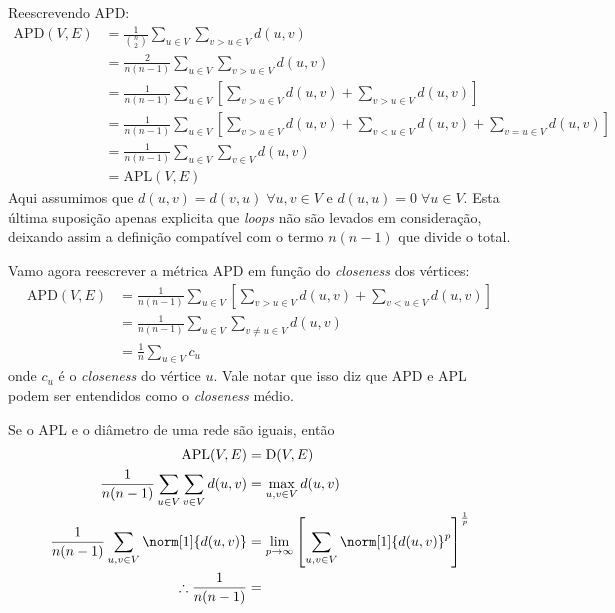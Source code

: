 \documentclass[l15, tikzdraw]{homework}
\begin{document}
	\subquest{}%
	Reescrevendo APD:
	\begin{align*}
		\text{APD}(V, E) %
		&= \frac{1}{\binom{n}{2}} \sum_{u \in V} \sum_{v > u \in V} d(u, v)\\[1ex]
		&= \frac{2}{n (n - 1)} \sum_{u \in V} \sum_{v > u \in V} d(u, v)\\[1ex]
		&= \frac{1}{n (n - 1)} \sum_{u \in V} \left[ \sum_{v > u \in V} d(u, v) + \sum_{v > u \in V} d(u, v) \right]\\
		&= \frac{1}{n (n - 1)} \sum_{u \in V} \left[ \sum_{v > u \in V} d(u, v) + \sum_{v < u \in V} d(u, v) + \sum_{v = u \in V} d(u, v)\right]\\
		&= \frac{1}{n (n - 1)} \sum_{u \in V} \sum_{v \in V} d(u, v)\\
		&= \text{APL}(V, E)
	\end{align*}
	Aqui assumimos que $d(u, v) = d(v, u) \;\forall u, v \in V$ e $d(u, u) = 0 \;\forall u \in V$. Esta última suposição apenas explicita que \textit{loops} não são levados em consideração, deixando assim a definição compatível com o termo $n (n - 1)$ que divide o total.\par

	Vamo agora reescrever a métrica APD em função do \textit{closeness} dos vértices:
	\begin{align*}
		\text{APD}(V, E) %
		&= \frac{1}{n (n - 1)} \sum_{u \in V} \left[ \sum_{v > u \in V} d(u, v) + \sum_{v < u \in V} d(u, v) \right]\\
		&= \frac{1}{n (n - 1)} \sum_{u \in V} \sum_{v \neq u \in V} d(u, v) \\
		&= \frac{1}{n} \sum_{u \in V} c_u
	\end{align*}
	onde $c_u$ é o \textit{closeness} do vértice $u$. Vale notar que isso diz que APD e APL podem ser entendidos como o \textit{closeness} médio.

	\subquest{}%
	Se o APL e o diâmetro de uma rede são iguais, então
	\begin{align*}
			\text{APL}(V, E) &= \text{D}(V, E) \\
			\frac{1}{n (n - 1)} \sum_{u \in V} \sum_{v \in V} d(u, v) &= \max_{u, v \in V} d(u, v) \\
			\frac{1}{n (n - 1)} \sum_{u, v \in V} \norm[1]{d(u, v)} &= \lim_{p \to \infty} \left[ \sum_{u, v \in V} \norm[1]{d(u, v)}^p \right]^{\frac{1}{p}} \\
\therefore  \frac{1}{n (n - 1)} &= 
	\end{align*}


	
\end{document}
